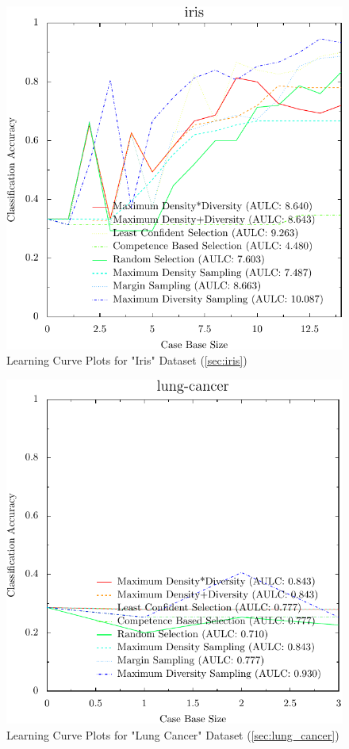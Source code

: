 \documentclass[a4paper,11pt]{report}
\begin{document}
\begin{figure}[h!]
\includegraphics{./Plots/iris}
\caption{Learning Curve Plots for "Iris" Dataset (\ref{sec:iris})}
\end{figure}

\begin{figure}[h!]
\includegraphics{./Plots/lung-cancer}
\caption{Learning Curve Plots for "Lung Cancer" Dataset (\ref{sec:lung_cancer})}
\end{figure}
\end{document}
